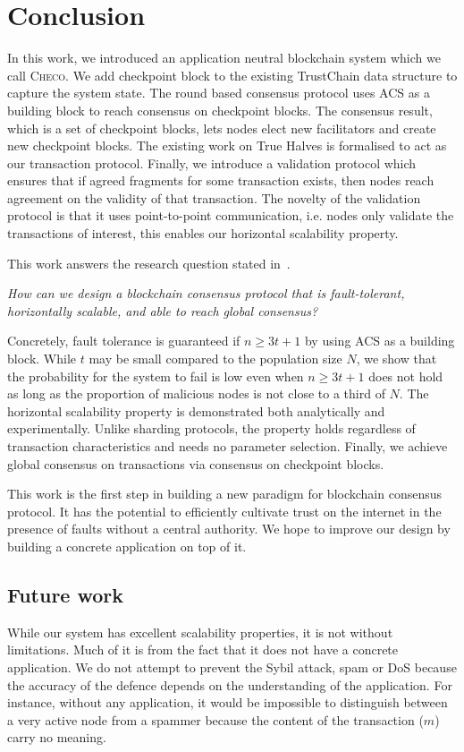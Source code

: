 \chapter{Conclusion}
\label{ch:conclusion}

In this work, we introduced an application neutral blockchain system which we call \textsc{Checo}.
We add checkpoint block to the existing TrustChain data structure to capture the system state.
The round based consensus protocol uses ACS as a building block to reach consensus on checkpoint blocks.
The consensus result, which is a set of checkpoint blocks, lets nodes elect new facilitators and create new checkpoint blocks.
The existing work on True Halves is formalised to act as our transaction protocol.
Finally, we introduce a validation protocol which ensures that if agreed fragments for some transaction exists,
then nodes reach agreement on the validity of that transaction.
The novelty of the validation protocol is that it uses point-to-point communication,
i.e. nodes only validate the transactions of interest,
this enables our horizontal scalability property.

This work answers the research question stated in~.
\begin{displayquote}
\emph{How can we design a blockchain consensus protocol that is fault-tolerant,
horizontally scalable,
and able to reach global consensus?}
\end{displayquote}
Concretely, fault tolerance is guaranteed if $n \ge 3t + 1$ by using ACS as a building block.
While $t$ may be small compared to the population size $N$,
we show that the probability for the system to fail is low even when $n \ge 3t + 1$ does not hold as long as the proportion of malicious nodes is not close to a third of $N$.
The horizontal scalability property is demonstrated both analytically and experimentally.
Unlike sharding protocols, the property holds regardless of transaction characteristics and needs no parameter selection.
Finally, we achieve global consensus on transactions via consensus on checkpoint blocks.

This work is the first step in building a new paradigm for blockchain consensus protocol.
It has the potential to efficiently cultivate trust on the internet in the presence of faults without a central authority.
We hope to improve our design by building a concrete application on top of it.

\section{Future work}
While our system has excellent scalability properties, it is not without limitations.
Much of it is from the fact that it does not have a concrete application.
We do not attempt to prevent the Sybil attack, spam or DoS because the accuracy of the defence depends on the understanding of the application.
For instance, without any application, it would be impossible to distinguish between a very active node from a spammer because the content of the transaction ($m$) carry no meaning.


